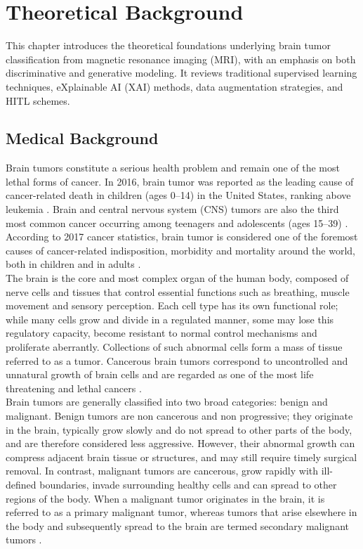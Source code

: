 \chapter{Theoretical Background}

This chapter introduces the theoretical foundations underlying brain tumor classification from magnetic resonance imaging (MRI), with an emphasis on both discriminative and generative modeling. It reviews traditional supervised learning techniques, eXplainable AI (XAI) methods, data augmentation strategies, and HITL schemes.


\section{Medical Background}

Brain tumors constitute a serious health problem and remain one of the most lethal forms of cancer. In 2016, brain tumor was reported as the leading cause of cancer-related death in children (ages 0--14) in the United States, ranking above leukemia \cite{abiwinanda}. Brain and central nervous system (CNS) tumors are also the third most common cancer occurring among teenagers and adolescents (ages 15--39) \cite{abiwinanda}. According to 2017 cancer statistics, brain tumor is considered one of the foremost causes of cancer-related indisposition, morbidity and mortality around the world, both in children and in adults \cite{Rehman2020}.\\

The brain is the core and most complex organ of the human body, composed of nerve cells and tissues that control essential functions such as breathing, muscle movement and sensory perception. Each cell type has its own functional role; while many cells grow and divide in a regulated manner, some may lose this regulatory capacity, become resistant to normal control mechanisms and proliferate aberrantly. Collections of such abnormal cells form a mass of tissue referred to as a tumor. Cancerous brain tumors correspond to uncontrolled and unnatural growth of brain cells and are regarded as one of the most life threatening and lethal cancers \cite{Rehman2020}.\\

Brain tumors are generally classified into two broad categories: benign and malignant. Benign tumors are non cancerous and non progressive; they originate in the brain, typically grow slowly and do not spread to other parts of the body, and are therefore considered less aggressive. However, their abnormal growth can compress adjacent brain tissue or structures, and may still require timely surgical removal. In contrast, malignant tumors are cancerous, grow rapidly with ill-defined boundaries, invade surrounding healthy cells and can spread to other regions of the body. When a malignant tumor originates in the brain, it is referred to as a primary malignant tumor, whereas tumors that arise elsewhere in the body and subsequently spread to the brain are termed secondary malignant tumors \cite{Rehman2020}.\\

